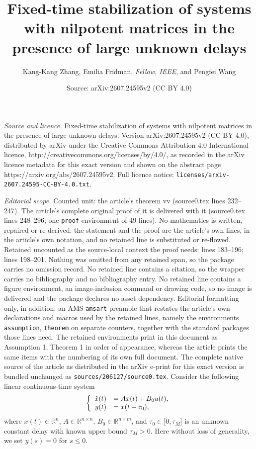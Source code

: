 \documentclass[10pt,a4paper]{amsart}
\title{Fixed-time stabilization of systems with nilpotent matrices in the presence of large unknown delays}
\author{Kang-Kang Zhang, Emilia Fridman, \textit{Fellow, IEEE}, and Pengfei Wang}
\date{Source: arXiv:2607.24595v2 (CC BY 4.0)}
\begin{document}
\maketitle

\noindent\emph{Source and licence.} Fixed-time stabilization of systems with nilpotent matrices in the presence of large unknown delays. Version arXiv:2607.24595v2 (CC BY 4.0), distributed by arXiv under the Creative Commons Attribution 4.0 International licence, http://creativecommons.org/licenses/by/4.0/, as recorded in the arXiv licence metadata for this exact version and shown on the abstract page https://arxiv.org/abs/2607.24595v2. Full licence notice: \texttt{licenses/arxiv-2607.24595-CC-BY-4.0.txt}.\par\smallskip

\noindent\textit{Editorial scope.} Counted unit: the article's theorem vv (source0.tex lines 232--247). The article's complete original proof of it is delivered with it (source0.tex lines 248--296, one \texttt{proof} environment of 49 lines). No mathematics is written, repaired or re-derived: the statement and the proof are the article's own lines, in the article's own notation, and no retained line is substituted or re-flowed.  Retained uncounted as the source-local context the proof needs: lines 183--196; lines 198--201.  Nothing was omitted from any retained span, so the package carries no omission record.  No retained line contains a citation, so the wrapper carries no bibliography and no bibliography entry.  No retained line contains a figure environment, an image-inclusion command or drawing code, so no image is delivered and the package declares no asset dependency.  Editorial formatting only, in addition: an AMS \texttt{amsart} preamble that restates the article's own declarations and macros used by the retained lines, namely the environments \texttt{assumption}, \texttt{theorem} on separate counters, together with the standard packages those lines need.  The retained environments print in this document as Assumption 1, Theorem 1 in order of appearance, whereas the article prints the same items with the numbering of its own full document.  The complete native source of the article as distributed in the arXiv e-print for this exact version is bundled unchanged as \texttt{sources/206127/source0.tex}.
Consider the following linear continuous-time system
\begin{equation}
\left\{
\begin{array}
[c]{rl}%
\dot{x}(t) & =Ax(t)+B_{0}u(t),\\
y(t) & =x(t-\tau_{0}),
\end{array}
\right.  \label{sys_norm}%
\end{equation}
where $x(t)\in\mathbb{R}^{n}$, $A\in\mathbb{R}^{n\times n}$, $B_{0}%
\in\mathbb{R}^{n\times m}$, and $\tau_{0}\in\lbrack0,\tau_{M}]$ is an unknown
constant delay with known upper bound $\tau_{M}>0$. Here without loss of
generality, we set $y(s)=0$ for $s\leq0$.
\end{document}

